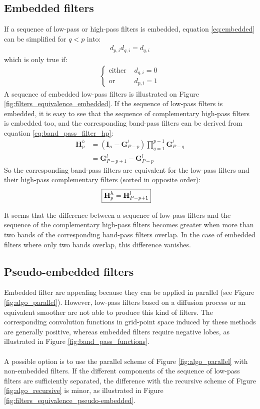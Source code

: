 \documentclass[12pt]{scrartcl}
\begin{document}
\subsection{Embedded filters}
If a sequence of low-pass or high-pass filters is embedded, equation \eqref{eq:embedded} can be simplified for $q < p$ into:
\begin{align}
d_{p,i} d_{q,i} = d_{q,i}
\end{align}
which is only true if:
\begin{align}
\left\{ \begin{array}{rl}
\text{either } & d_{q,i} = 0 \\
\text{or } & d_{p,i} = 1
\end{array}
\right.
\end{align}
A sequence of embedded low-pass filters is illustrated on Figure \ref{fig:filters_equivalence_embedded}. If the sequence of low-pass filters is embedded, it is easy to see that the sequence of complementary high-pass filters is embedded too, and the corresponding band-pass filters can be derived from equation \eqref{eq:band_pass_filter_hp}:
\begin{align}
\mathbf{H}^h_p & = \left(\mathbf{I}_n - \mathbf{G}^l_{P-p}\right) \prod_{q=1}^{p-1} \mathbf{G}^l_{P-q} \nonumber \\
& = \mathbf{G}^l_{P-p+1} - \mathbf{G}^l_{P-p}
\end{align}
So the corresponding band-pass filters are equivalent for the low-pass filters and their high-pass complementary filters (sorted in opposite order):
\begin{align}
\Aboxed{\mathbf{H}^h_p = \mathbf{H}^l_{P-p+1}}
\end{align}

It seems that the difference between a sequence of low-pass filters and the sequence of the complementary high-pass filters becomes greater when more than two bands of the corresponding band-pass filters overlap. In the case of embedded filters where only two bands overlap, this difference vanishes.

\subsection{Pseudo-embedded filters}
Embedded filter are appealing because they can be applied in parallel (see Figure \ref{fig:algo_parallel}). However, low-pass filters based on a diffusion process or an equivalent smoother are not able to produce this kind of filters. The corresponding convolution functions in grid-point space induced by these methods are generally positive, whereas embedded filters require negative lobes, as illustrated in Figure \ref{fig:band_pass_functions}.\\
$  $\\
A possible option is to use the parallel scheme of Figure \ref{fig:algo_parallel} with non-embedded filters. If the different components of the sequence of low-pass filters are sufficiently separated, the difference with the recursive scheme of Figure \ref{fig:algo_recursive} is minor, as illustrated in Figure \ref{fig:filters_equivalence_pseudo-embedded}.
\end{document}
